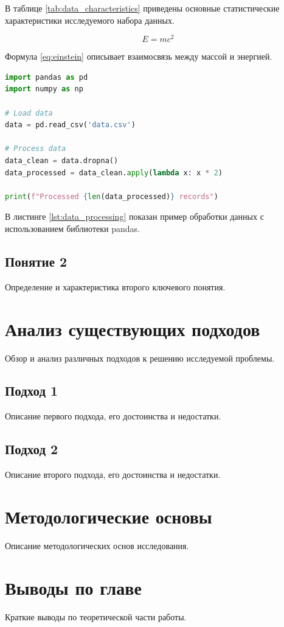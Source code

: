В таблице \ref{tab:data_characteristics} приведены основные статистические характеристики исследуемого набора данных.

\begin{equation}
E = mc^2
\label{eq:einstein}
\end{equation}

Формула \ref{eq:einstein} описывает взаимосвязь между массой и энергией.

\begin{lstlisting}[style=code, language=Python, caption={Пример обработки данных}, label={lst:data_processing}]
import pandas as pd
import numpy as np

# Load data
data = pd.read_csv('data.csv')

# Process data
data_clean = data.dropna()
data_processed = data_clean.apply(lambda x: x * 2)

print(f"Processed {len(data_processed)} records")
\end{lstlisting}

В листинге \ref{lst:data_processing} показан пример обработки данных с использованием библиотеки pandas.

\subsection{Понятие 2}

Определение и характеристика второго ключевого понятия.

\section{Анализ существующих подходов}

Обзор и анализ различных подходов к решению исследуемой проблемы.

\subsection{Подход 1}

Описание первого подхода, его достоинства и недостатки.

\subsection{Подход 2}

Описание второго подхода, его достоинства и недостатки.

\section{Методологические основы}

Описание методологических основ исследования.

\section{Выводы по главе}

Краткие выводы по теоретической части работы.

